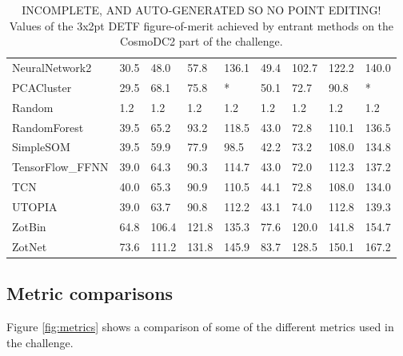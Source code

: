 \documentclass[twocolumn,twocolappendix]{aastex63}
\begin{document}
\begin{table}[]
\begin{tabular}{|l|llll|llll|}
{\sc NeuralNetwork2 } & 30.5 & 48.0    & 57.8    & 136.1    & 49.4             & 102.7             & 122.2             & 140.0\\
{\sc PCACluster } & 29.5 & 68.1    & 75.8    & *    & 50.1             & 72.7             & 90.8             & *\\
{\sc Random } & 1.2 & 1.2    & 1.2    & 1.2    & 1.2             & 1.2             & 1.2             & 1.2\\
{\sc RandomForest } & 39.5 & 65.2    & 93.2    & 118.5    & 43.0             & 72.8             & 110.1             & 136.5\\
{\sc SimpleSOM } & 39.5 & 59.9    & 77.9    & 98.5    & 42.2             & 73.2             & 108.0             & 134.8\\
{\sc TensorFlow\_FFNN } & 39.0 & 64.3    & 90.3    & 114.7    & 43.0             & 72.0             & 112.3             & 137.2\\
{\sc TCN } & 40.0 & 65.3    & 90.9    & 110.5    & 44.1             & 72.8             & 108.0             & 134.0\\
{\sc UTOPIA } & 39.0 & 63.7    & 90.8    & 112.2    & 43.1             & 74.0             & 112.8             & 139.3\\
{\sc ZotBin } & 64.8 & 106.4    & 121.8    & 135.3    & 77.6             & 120.0             & 141.8             & 154.7\\
{\sc ZotNet } & 73.6 & 111.2    & 131.8    & 145.9    & 83.7             & 128.5             & 150.1             & 167.2\\
\end{tabular}
\caption{INCOMPLETE, AND AUTO-GENERATED SO NO POINT EDITING! Values of the 3x2pt DETF figure-of-merit achieved by entrant methods on the 
CosmoDC2 part of the challenge.}
\label{tab:cosmodc2}
\end{table}

\subsection{Metric comparisons}
Figure \ref{fig:metrics} shows a comparison of some of the different metrics used in the challenge.
\end{document}
